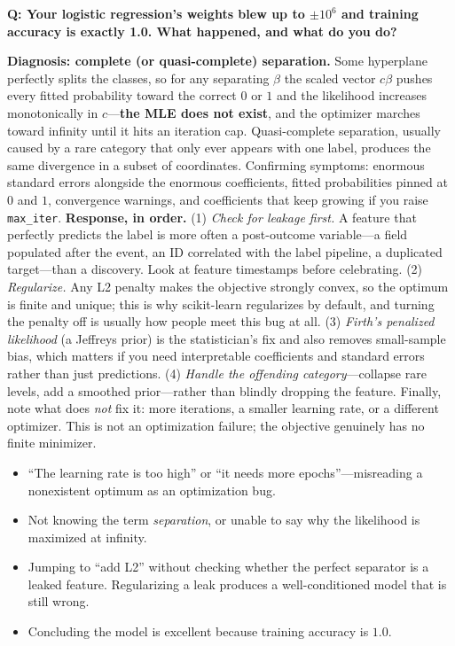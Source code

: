 \begin{interviewq}
\textbf{Q: Your logistic regression's weights blew up to $\pm 10^6$ and training accuracy is exactly 1.0. What happened, and what do you do?}

 \quad {} \quad \badgefreq{\freqmed}

\stronganswer

\textbf{Diagnosis: complete (or quasi-complete) separation.} Some hyperplane perfectly splits the classes, so for any separating $\beta$ the scaled vector $c\beta$ pushes every fitted probability toward the correct $0$ or $1$ and the likelihood increases monotonically in $c$---\textbf{the MLE does not exist}, and the optimizer marches toward infinity until it hits an iteration cap. Quasi-complete separation, usually caused by a rare category that only ever appears with one label, produces the same divergence in a subset of coordinates. Confirming symptoms: enormous standard errors alongside the enormous coefficients, fitted probabilities pinned at $0$ and $1$, convergence warnings, and coefficients that keep growing if you raise \texttt{max\_iter}. \textbf{Response, in order.} (1) \emph{Check for leakage first.} A feature that perfectly predicts the label is more often a post-outcome variable---a field populated after the event, an ID correlated with the label pipeline, a duplicated target---than a discovery. Look at feature timestamps before celebrating. (2) \emph{Regularize.} Any L2 penalty makes the objective strongly convex, so the optimum is finite and unique; this is why scikit-learn regularizes by default, and turning the penalty off is usually how people meet this bug at all. (3) \emph{Firth's penalized likelihood} (a Jeffreys prior) is the statistician's fix and also removes small-sample bias, which matters if you need interpretable coefficients and standard errors rather than just predictions. (4) \emph{Handle the offending category}---collapse rare levels, add a smoothed prior---rather than blindly dropping the feature. Finally, note what does \emph{not} fix it: more iterations, a smaller learning rate, or a different optimizer. This is not an optimization failure; the objective genuinely has no finite minimizer.

\redflags
\begin{itemize}
    \item ``The learning rate is too high'' or ``it needs more epochs''---misreading a nonexistent optimum as an optimization bug.
    \item Not knowing the term \emph{separation}, or unable to say why the likelihood is maximized at infinity.
    \item Jumping to ``add L2'' without checking whether the perfect separator is a leaked feature. Regularizing a leak produces a well-conditioned model that is still wrong.
    \item Concluding the model is excellent because training accuracy is $1.0$.
\end{itemize}


\end{interviewq}
